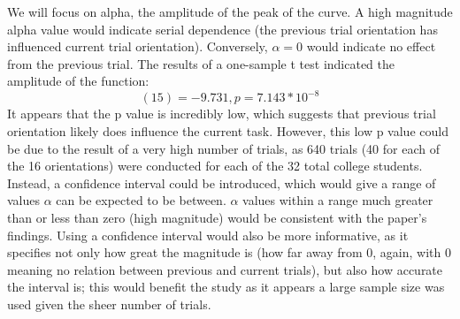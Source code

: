 \documentclass[letterpaper, 12 pt, conference]{article}
\begin{document}
\begin{enumerate}
We will focus on alpha, the amplitude of the peak of the curve. A high magnitude alpha value would indicate serial dependence (the previous trial orientation has influenced current trial orientation). Conversely, $\alpha = 0$ would indicate no effect from the previous trial. The results of a one-sample t test indicated the amplitude of the function: 
\begin{equation}
(15) = −9.731, p = 7.143*10^{-8}
\end{equation}
It appears that the p value is incredibly low, which suggests that previous trial orientation likely does influence the current task. However, this low p value could be due to the result of a very high number of trials, as 640 trials (40 for each of the 16 orientations) were conducted for each of the 32 total college students. Instead, a confidence interval could be introduced, which would give a range of values $\alpha$ can be expected to be between. $\alpha$ values within a range much greater than or less than zero (high magnitude) would be consistent with the paper's findings. Using a confidence interval would also be more informative, as it specifies not only how great the magnitude is (how far away from 0, again, with 0 meaning no relation between previous and current trials), but also how accurate the interval is; this would benefit the study as it appears a large sample size was used given the sheer number of trials. 


\end{enumerate}
\end{document}
